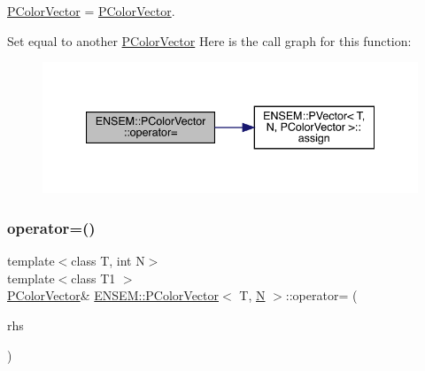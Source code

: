 \mbox{\hyperlink{classENSEM_1_1PColorVector}{P\+Color\+Vector}} = \mbox{\hyperlink{classENSEM_1_1PColorVector}{P\+Color\+Vector}}. 

Set equal to another \mbox{\hyperlink{classENSEM_1_1PColorVector}{P\+Color\+Vector}} Here is the call graph for this function\+:
\nopagebreak
\begin{figure}[H]
\begin{center}
\leavevmode
\includegraphics[width=340pt]{de/dfe/classENSEM_1_1PColorVector_ac5919a92dade0bb7763353ed7d05b8b2_cgraph}
\end{center}
\end{figure}
\mbox{\label{classENSEM_1_1PColorVector_ac5919a92dade0bb7763353ed7d05b8b2}} 
\subsubsection{\texorpdfstring{operator=()}{operator=()}\hspace{0.1cm}{\footnotesize\ttfamily [3/3]}}
{\footnotesize\ttfamily template$<$class T, int N$>$ \\
template$<$class T1 $>$ \\
\mbox{\hyperlink{classENSEM_1_1PColorVector}{P\+Color\+Vector}}\& \mbox{\hyperlink{classENSEM_1_1PColorVector}{E\+N\+S\+E\+M\+::\+P\+Color\+Vector}}$<$ T, \mbox{\hyperlink{adat__devel_2lib_2hadron_2operator__name__util_8cc_a7722c8ecbb62d99aee7ce68b1752f337}{N}} $>$\+::operator= (\begin{DoxyParamCaption}\item[{const \mbox{\hyperlink{classENSEM_1_1PColorVector}{P\+Color\+Vector}}$<$ T1, \mbox{\hyperlink{adat__devel_2lib_2hadron_2operator__name__util_8cc_a7722c8ecbb62d99aee7ce68b1752f337}{N}} $>$ \&}]{rhs }\end{DoxyParamCaption})\hspace{0.3cm}{\ttfamily [inline]}}



